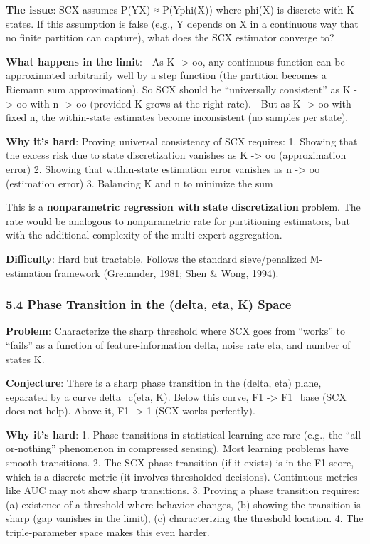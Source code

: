 \documentclass[
  12pt,
]{ctexart}
\begin{document}
\textbf{The issue}: SCX assumes P(Y\textbar X) ≈ P(Y\textbar phi(X))
where phi(X) is discrete with K states. If this assumption is false
(e.g., Y depends on X in a continuous way that no finite partition can
capture), what does the SCX estimator converge to?

\textbf{What happens in the limit}: - As K -\textgreater{} oo, any
continuous function can be approximated arbitrarily well by a step
function (the partition becomes a Riemann sum approximation). So SCX
should be ``universally consistent'' as K -\textgreater{} oo with n
-\textgreater{} oo (provided K grows at the right rate). - But as K
-\textgreater{} oo with fixed n, the within-state estimates become
inconsistent (no samples per state).

\textbf{Why it's hard}: Proving universal consistency of SCX requires:
1. Showing that the excess risk due to state discretization vanishes as
K -\textgreater{} oo (approximation error) 2. Showing that within-state
estimation error vanishes as n -\textgreater{} oo (estimation error) 3.
Balancing K and n to minimize the sum

This is a \textbf{nonparametric regression with state discretization}
problem. The rate would be analogous to nonparametric rate for
partitioning estimators, but with the additional complexity of the
multi-expert aggregation.

\textbf{Difficulty}: Hard but tractable. Follows the standard
sieve/penalized M-estimation framework (Grenander, 1981; Shen \& Wong,
1994).

\subsubsection{5.4 Phase Transition in the (delta, eta, K)
Space}\label{phase-transition-in-the-delta-eta-k-space}

\textbf{Problem}: Characterize the sharp threshold where SCX goes from
``works'' to ``fails'' as a function of feature-information delta, noise
rate eta, and number of states K.

\textbf{Conjecture}: There is a sharp phase transition in the (delta,
eta) plane, separated by a curve delta\_c(eta, K). Below this curve, F1
-\textgreater{} F1\_base (SCX does not help). Above it, F1
-\textgreater{} 1 (SCX works perfectly).

\textbf{Why it's hard}: 1. Phase transitions in statistical learning are
rare (e.g., the ``all-or-nothing'' phenomenon in compressed sensing).
Most learning problems have smooth transitions. 2. The SCX phase
transition (if it exists) is in the F1 score, which is a discrete metric
(it involves thresholded decisions). Continuous metrics like AUC may not
show sharp transitions. 3. Proving a phase transition requires: (a)
existence of a threshold where behavior changes, (b) showing the
transition is sharp (gap vanishes in the limit), (c) characterizing the
threshold location. 4. The triple-parameter space makes this even
harder.
\end{document}
